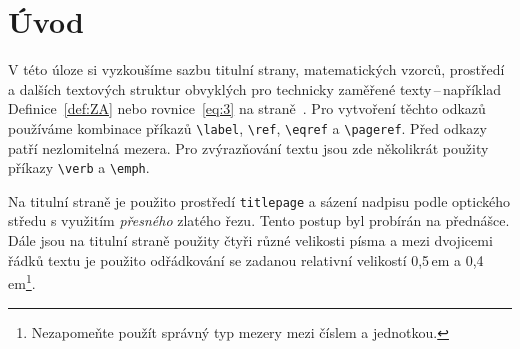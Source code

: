 \documentclass[twocolumn,a4paper,11pt]{article}
\theoremstyle{definition}
\theoremstyle{plain}
\begin{document}

\clearpage
{}

\section*{Úvod}
\label{sec:intro}
V této úloze si vyzkoušíme sazbu titulní strany, matematických vzorců, prostředí a dalších textových struktur obvyklých pro technicky zaměřené texty\,--\,například Definice~\ref{def:ZA} nebo rovnice~\eqref{eq:3} na straně~\pageref{sec:rovnice}. Pro vytvoření těchto odkazů používáme kombinace příkazů \verb|\label|, \verb|\ref|, \verb|\eqref| a \verb|\pageref|. Před odkazy patří nezlomitelná mezera. Pro zvýrazňování textu jsou zde několikrát použity příkazy \verb|\verb| a \verb|\emph|.

Na titulní straně je použito prostředí \verb|titlepage| a sázení nadpisu podle optického středu s využitím \emph{přesného} zlatého řezu. Tento postup byl probírán na přednášce. Dále jsou na titulní straně použity čtyři různé velikosti písma a mezi dvojicemi řádků textu je použito odřádkování se zadanou relativní velikostí 0,5\,em a 0,4\,em\footnote{Nezapomeňte použít správný typ mezery mezi číslem a jednotkou.}.
\end{document}
